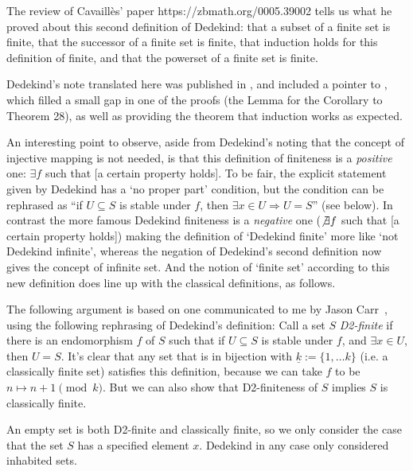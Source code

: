 \documentclass[leqno,hidelinks,10pt]{article}
\theoremstyle{definition}
\begin{document}
The review of Cavaillès' paper https://zbmath.org/0005.39002 tells us what he proved about this second definition of Dedekind: that a subset of a finite set is finite, that the successor of a finite set is finite, that induction holds for this definition of finite, and that the powerset of a finite set is finite.


\bigskip

Dedekind's note translated here was published in \cite[\S LXIII.]{Dedekind_Werke}, and included a pointer to \cite{Cavailes_32}, which filled a small gap in one of the proofs (the Lemma for the Corollary to Theorem 28), as well as providing the theorem that induction works as expected.

An interesting point to observe, aside from Dedekind's noting that the concept of injective mapping is not needed, is that this definition of finiteness is a \emph{positive} one: $\exists f$ such that [a certain property holds].
To be fair, the explicit statement given by Dedekind has a `no proper part' condition, but the condition can be rephrased as ``if $U\subseteq S$ is stable under $f$, then $\exists x\in U \Rightarrow U=S$'' (see below).
In contrast the more famous Dedekind finiteness is a \emph{negative} one ($\not\exists f$ such that [a certain property holds]) making the definition of `Dedekind finite' more like `not Dedekind infinite', whereas the negation of Dedekind's second definition now gives the concept of infinite set.
And the notion of `finite set' according to this new definition does line up with the classical definitions, as follows.


The following argument is based on one communicated to me by Jason Carr~, using the following rephrasing of Dedekind's definition: Call a set $S$ \emph{D2-finite} if there is an endomorphism $f$ of $S$ such that if $U\subseteq S$ is stable under $f$, and $\exists x \in U$, then $U=S$.
It's clear that any set that is in bijection with $\underline{k}:=\{1,\ldots k\}$ (i.e. a classically finite set) satisfies this definition, because we can take $f$ to be $n\mapsto n+1\pmod{k}$. But we can also show that D2-finiteness of $S$ implies $S$ is classically finite.

An empty set is both D2-finite and classically finite, so we only consider the case that the set $S$ has a specified element $x$.
Dedekind in any case only considered inhabited sets.
\end{document}
